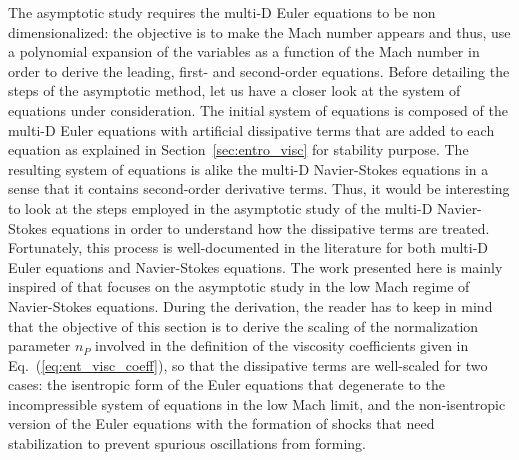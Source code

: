 \documentclass[preprint,10pt]{elsarticle}
\newcommand{\eqt}[1]{Eq.~(\ref{#1})}                     %
\newcommand{\sct}[1]{Section~\ref{#1}}                   %
\begin{document}
The asymptotic study requires the multi-D Euler equations to be non dimensionalized: the objective is to make the Mach number appears and thus, use a polynomial expansion of the variables as a function of the Mach number in order to derive the leading, first- and second-order equations. Before detailing the steps of the asymptotic method, let us have a closer look at the system of equations under consideration. The initial system of equations is composed of the multi-D Euler equations with artificial dissipative terms that are added to each equation as explained in \sct{sec:entro_visc} for stability purpose. The resulting system of equations is alike the multi-D Navier-Stokes equations in a sense that it contains second-order derivative terms. Thus, it would be interesting to look at the steps employed in the asymptotic study of the multi-D Navier-Stokes equations in order to understand how the dissipative terms are treated. Fortunately, this process is well-documented in the literature \cite{LowMach1, LowMach2, LowMach3} for both multi-D Euler equations and Navier-Stokes equations. The work presented here is mainly inspired of \cite{Muller} that focuses on the asymptotic study in the low Mach regime of Navier-Stokes equations. During the derivation, the reader has to keep in mind that the objective of this section is to derive the scaling of the normalization parameter $n_P$ involved in the definition of the viscosity coefficients given in \eqt{eq:ent_visc_coeff}, so that the dissipative terms are well-scaled for two cases: the isentropic form of the Euler equations that degenerate to the incompressible system of equations in the low Mach limit, and the non-isentropic version of the Euler equations with the formation of shocks that need stabilization to prevent spurious oscillations from forming.\\
\end{document}
